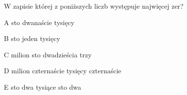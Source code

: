 \begin{tresc}
W zapisie której z poniższych liczb występuje najwięcej zer?
\end{tresc}
\begin{wariant}{A} sto dwanaście tysięcy \end{wariant}
\begin{wariant}{B} sto jeden tysięcy \end{wariant}
\begin{wariant}{C} milion sto dwadzieścia trzy \end{wariant}
\begin{wariant}{D} milion czternaście tysięcy czternaście \end{wariant}
\begin{wariant}{E} sto dwa tysiące sto dwa \end{wariant}

